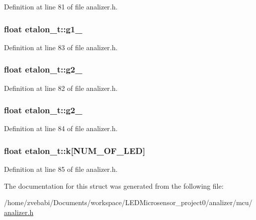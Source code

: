 Definition at line 81 of file analizer.\+h.

\hypertarget{structetalon__t_aada4338937cd62394d368a85228f045e}{
\subsubsection[{g1\+\_\+2}]{\setlength{\rightskip}{0pt plus 5cm}float etalon\+\_\+t\+::g1\+\_}}\label{structetalon__t_aada4338937cd62394d368a85228f045e}


Definition at line 83 of file analizer.\+h.

\hypertarget{structetalon__t_ace57ce9cb8103e1d334b8f54d37f11de}{
\subsubsection[{g2\+\_\+1}]{\setlength{\rightskip}{0pt plus 5cm}float etalon\+\_\+t\+::g2\+\_}}\label{structetalon__t_ace57ce9cb8103e1d334b8f54d37f11de}


Definition at line 82 of file analizer.\+h.

\hypertarget{structetalon__t_a77f1f89ca2ce92b762e43c9960248507}{
\subsubsection[{g2\+\_\+2}]{\setlength{\rightskip}{0pt plus 5cm}float etalon\+\_\+t\+::g2\+\_}}\label{structetalon__t_a77f1f89ca2ce92b762e43c9960248507}


Definition at line 84 of file analizer.\+h.

\hypertarget{structetalon__t_a70cad7a56e0aaeb8998957d09cf99599}{
\subsubsection[{k}]{\setlength{\rightskip}{0pt plus 5cm}float etalon\+\_\+t\+::k\mbox{[}{\bf N\+U\+M\+\_\+\+O\+F\+\_\+\+L\+E\+D}\mbox{]}}}\label{structetalon__t_a70cad7a56e0aaeb8998957d09cf99599}


Definition at line 85 of file analizer.\+h.



The documentation for this struct was generated from the following file\+:\begin{DoxyCompactItemize}
\item 
/home/zvebabi/\+Documents/workspace/\+L\+E\+D\+Microsensor\+\_\+project0/analizer/mcu/\hyperlink{analizer_8h}{analizer.\+h}\end{DoxyCompactItemize}
